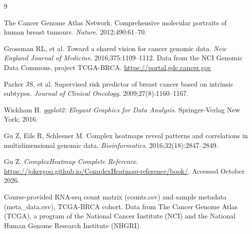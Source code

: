 \documentclass[11pt]{article}
\begin{document}
\newpage
\begin{thebibliography}{9}

The Cancer Genome Atlas Network. Comprehensive molecular portraits of human breast tumours. \textit{Nature}. 2012;490:61--70.

Grossman RL, et al. Toward a shared vision for cancer genomic data. \textit{New England Journal of Medicine}. 2016;375:1109--1112. Data from the NCI Genomic Data Commons, project TCGA-BRCA. \url{https://portal.gdc.cancer.gov}

Parker JS, et al. Supervised risk predictor of breast cancer based on intrinsic subtypes. \textit{Journal of Clinical Oncology}. 2009;27(8):1160--1167.

Wickham H. \textit{ggplot2: Elegant Graphics for Data Analysis}. Springer-Verlag New York; 2016.

Gu Z, Eils R, Schlesner M. Complex heatmaps reveal patterns and correlations in multidimensional genomic data. \textit{Bioinformatics}. 2016;32(18):2847--2849.

Gu Z. \textit{ComplexHeatmap Complete Reference}. \url{https://jokergoo.github.io/ComplexHeatmap-reference/book/}. Accessed October 2026.

Course-provided RNA-seq count matrix (counts.csv) and sample metadata (meta\_data.csv), TCGA-BRCA cohort. Data from The Cancer Genome Atlas (TCGA), a program of the National Cancer Institute (NCI) and the National Human Genome Research Institute (NHGRI).

\end{thebibliography}
\end{document}
